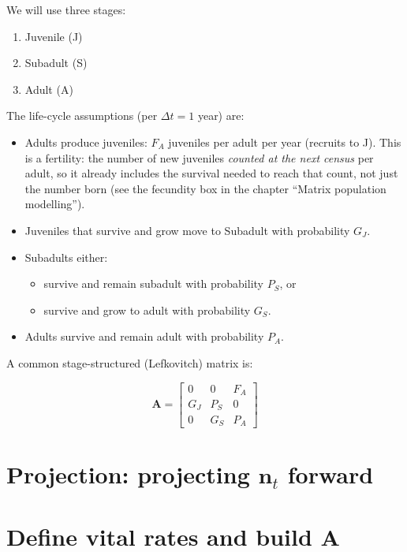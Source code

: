 \documentclass[
  a4paper]{book}
\providecommand{\tightlist}{%
  \setlength{\itemsep}{0pt}\setlength{\parskip}{0pt}}
\begin{document}
We will use three stages:

\begin{enumerate}
\def\labelenumi{\arabic{enumi}.}
\tightlist
\item
  Juvenile (J)
\item
  Subadult (S)
\item
  Adult (A)
\end{enumerate}

The life-cycle assumptions (per \(\Delta t = 1\) year) are:

\begin{itemize}
\tightlist
\item
  Adults produce juveniles: \(F_A\) juveniles per adult per year (recruits to J). This is a fertility: the number of new juveniles \emph{counted at the next census} per adult, so it already includes the survival needed to reach that count, not just the number born (see the fecundity box in the chapter ``Matrix population modelling'').
\item
  Juveniles that survive and grow move to Subadult with probability \(G_J\).
\item
  Subadults either:

  \begin{itemize}
  \tightlist
  \item
    survive and remain subadult with probability \(P_S\), or
  \item
    survive and grow to adult with probability \(G_S\).
  \end{itemize}
\item
  Adults survive and remain adult with probability \(P_A\).
\end{itemize}

A common stage-structured (Lefkovitch) matrix is:

\[
\mathbf{A} =
\begin{bmatrix}
0 & 0 & F_A \\
G_J & P_S & 0 \\
0 & G_S & P_A
\end{bmatrix}
\]

\section{\texorpdfstring{Projection: projecting \(\mathbf{n}_t\) forward}{Projection: projecting \textbackslash mathbf\{n\}\_t forward}}\label{projection-projecting-mathbfn_t-forward}

\section{\texorpdfstring{Define vital rates and build \(\mathbf{A}\)}{Define vital rates and build \textbackslash mathbf\{A\}}}\label{define-vital-rates-and-build-mathbfa}
\end{document}
